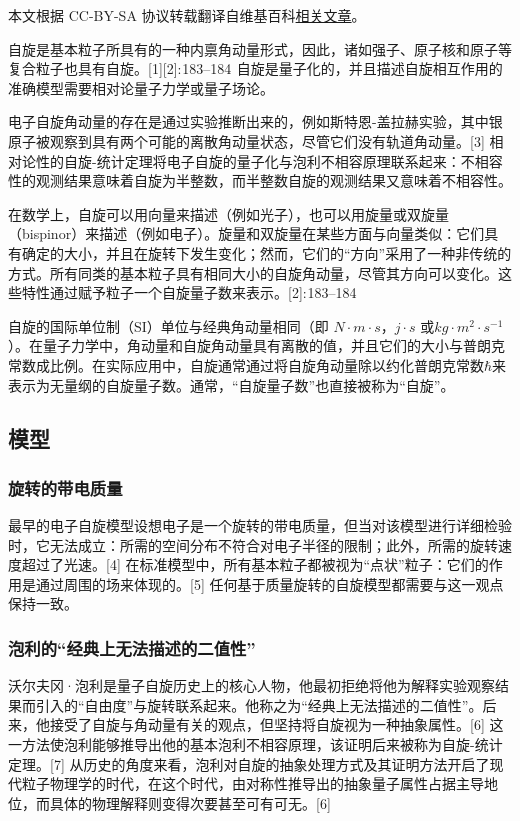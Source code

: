 
本文根据 CC-BY-SA 协议转载翻译自维基百科\href{https://en.wikipedia.org/wiki/Spin_(physics)}{相关文章}。

自旋是基本粒子所具有的一种内禀角动量形式，因此，诸如强子、原子核和原子等复合粒子也具有自旋。[1][2]: 183–184  自旋是量子化的，并且描述自旋相互作用的准确模型需要相对论量子力学或量子场论。

电子自旋角动量的存在是通过实验推断出来的，例如斯特恩-盖拉赫实验，其中银原子被观察到具有两个可能的离散角动量状态，尽管它们没有轨道角动量。[3] 相对论性的自旋-统计定理将电子自旋的量子化与泡利不相容原理联系起来：不相容性的观测结果意味着自旋为半整数，而半整数自旋的观测结果又意味着不相容性。

在数学上，自旋可以用向量来描述（例如光子），也可以用旋量或双旋量（bispinor）来描述（例如电子）。旋量和双旋量在某些方面与向量类似：它们具有确定的大小，并且在旋转下发生变化；然而，它们的“方向”采用了一种非传统的方式。所有同类的基本粒子具有相同大小的自旋角动量，尽管其方向可以变化。这些特性通过赋予粒子一个自旋量子数来表示。[2]: 183–184 

自旋的国际单位制（SI）单位与经典角动量相同（即 \(N\cdot m\cdot s\)，\(j\cdot s\) 或\(kg\cdot m^2\cdot s^{-1}\)）。在量子力学中，角动量和自旋角动量具有离散的值，并且它们的大小与普朗克常数成比例。在实际应用中，自旋通常通过将自旋角动量除以约化普朗克常数\(\hbar\)来表示为无量纲的自旋量子数。通常，“自旋量子数”也直接被称为“自旋”。
\subsection{模型}
\subsubsection{旋转的带电质量}  
最早的电子自旋模型设想电子是一个旋转的带电质量，但当对该模型进行详细检验时，它无法成立：所需的空间分布不符合对电子半径的限制；此外，所需的旋转速度超过了光速。[4] 在标准模型中，所有基本粒子都被视为“点状”粒子：它们的作用是通过周围的场来体现的。[5] 任何基于质量旋转的自旋模型都需要与这一观点保持一致。
\subsubsection{泡利的“经典上无法描述的二值性” } 
沃尔夫冈·泡利是量子自旋历史上的核心人物，他最初拒绝将他为解释实验观察结果而引入的“自由度”与旋转联系起来。他称之为“经典上无法描述的二值性”。后来，他接受了自旋与角动量有关的观点，但坚持将自旋视为一种抽象属性。[6] 这一方法使泡利能够推导出他的基本泡利不相容原理，该证明后来被称为自旋-统计定理。[7] 从历史的角度来看，泡利对自旋的抽象处理方式及其证明方法开启了现代粒子物理学的时代，在这个时代，由对称性推导出的抽象量子属性占据主导地位，而具体的物理解释则变得次要甚至可有可无。[6]
